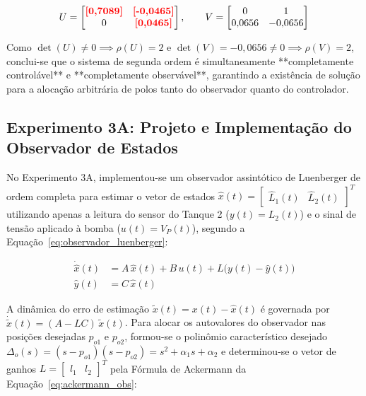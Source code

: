 \documentclass[a4paper,12pt]{article}
\newcommand{\dado}[1]{\textcolor{red}{\textbf{[#1]}}}
\newcommand{\dado}[1]{#1}
\begin{document}
\begin{equation}
    U = \begin{bmatrix} \dado{0{,}7089} & \dado{-0{,}0465} \\ 0 & \dado{0{,}0465} \end{bmatrix}, \qquad
    V = \begin{bmatrix} 0 & 1 \\ 0{,}0656 & -0{,}0656 \end{bmatrix}
    \label{eq:control_observ}
\end{equation}

\begin{justify}
    \noindent Como $\det(U) \neq 0 \implies \rho(U) = 2$ e $\det(V) = -0{,}0656 \neq 0 \implies \rho(V) = 2$, conclui-se que o sistema de segunda ordem é simultaneamente **completamente controlável** e **completamente observável**, garantindo a existência de solução para a alocação arbitrária de polos tanto do observador quanto do controlador.
\end{justify}

\subsection{Experimento 3A: Projeto e Implementação do Observador de Estados}

\begin{justify}
    \hspace{4ex}No Experimento 3A, implementou-se um observador assintótico de Luenberger de ordem completa para estimar o vetor de estados $\hat{x}(t) = \begin{bmatrix} \hat{L}_1(t) & \hat{L}_2(t) \end{bmatrix}^T$ utilizando apenas a leitura do sensor do Tanque 2 ($y(t) = L_2(t)$) e o sinal de tensão aplicado à bomba ($u(t) = V_P(t)$), segundo a Equação~\eqref{eq:observador_luenberger}:
\end{justify}

\begin{equation}
    \begin{aligned}
        \dot{\hat{x}}(t) &= A\,\hat{x}(t) + B\,u(t) + L\big(y(t) - \hat{y}(t)\big) \\
        \hat{y}(t) &= C\,\hat{x}(t)
    \end{aligned}
    \label{eq:observador_luenberger}
\end{equation}

\begin{justify}
    \hspace{4ex}A dinâmica do erro de estimação $\tilde{x}(t) = x(t) - \hat{x}(t)$ é governada por $\dot{\tilde{x}}(t) = (A - LC)\,\tilde{x}(t)$. Para alocar os autovalores do observador nas posições desejadas $p_{o1}$ e $p_{o2}$, formou-se o polinômio característico desejado $\Delta_o(s) = (s - p_{o1})(s - p_{o2}) = s^2 + \alpha_1 s + \alpha_2$ e determinou-se o vetor de ganhos $L = \begin{bmatrix} l_1 & l_2 \end{bmatrix}^T$ pela Fórmula de Ackermann da Equação~\eqref{eq:ackermann_obs}:
\end{justify}
\end{document}
